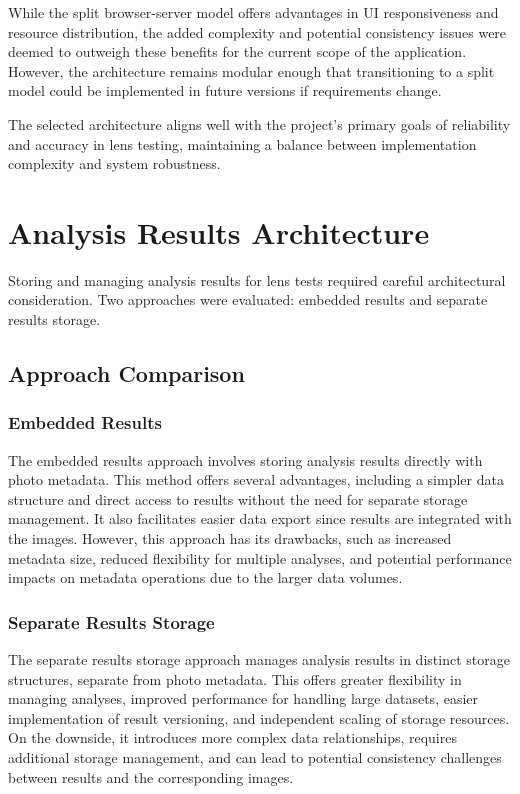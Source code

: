 While the split browser-server model offers advantages in UI responsiveness and resource distribution, the added complexity and potential consistency issues were deemed to outweigh these benefits for the current scope of the application. However, the architecture remains modular enough that transitioning to a split model could be implemented in future versions if requirements change.

The selected architecture aligns well with the project's primary goals of reliability and accuracy in lens testing, maintaining a balance between implementation complexity and system robustness.

\section{Analysis Results Architecture}

Storing and managing analysis results for lens tests required careful architectural consideration. Two approaches were evaluated: embedded results and separate results storage.

\subsection{Approach Comparison}

\subsubsection{Embedded Results}

The embedded results approach involves storing analysis results directly with photo metadata. This method offers several advantages, including a simpler data structure and direct access to results without the need for separate storage management. It also facilitates easier data export since results are integrated with the images. However, this approach has its drawbacks, such as increased metadata size, reduced flexibility for multiple analyses, and potential performance impacts on metadata operations due to the larger data volumes.

\subsubsection{Separate Results Storage}

The separate results storage approach manages analysis results in distinct storage structures, separate from photo metadata. This offers greater flexibility in managing analyses, improved performance for handling large datasets, easier implementation of result versioning, and independent scaling of storage resources. On the downside, it introduces more complex data relationships, requires additional storage management, and can lead to potential consistency challenges between results and the corresponding images.

